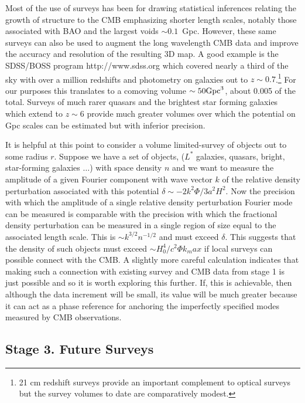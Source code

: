 \documentclass[psfig,11pt]{article}
\begin{document}
Most of the use of surveys has been for drawing statistical inferences relating the growth of structure to the CMB emphasizing shorter length scales, notably those associated with BAO and the largest voids $\sim0.1$~Gpc. However, these same surveys can also be used to augment the long wavelength CMB data and improve the accuracy and resolution of the resulting 3D map. A good example is the SDSS/BOSS program http://www.sdss.org which covered nearly a third of the sky with over a million redshifts and photometry on galaxies out to $z\sim0.7$.\footnote{21 cm redshift surveys provide an important complement to optical surveys but the survey volumes to date are comparatively modest.} For our purposes this translates to a comoving volume $\sim50{\rm Gpc}^3$, about 0.005 of the total. Surveys of much rarer quasars and the brightest star forming galaxies which extend to  $z\sim6$ provide much greater volumes over which the potential on Gpc scales can be estimated but with inferior precision.

It is helpful at this point to consider a volume limited-survey of objects out to some radius $r$. Suppose we have a set of objects, ($L^\ast$ galaxies, quasars, bright, star-forming galaxies $\dots$) with space density $n$ and we want to measure the amplitude of a given Fourier component with wave vector $k$ of the relative density perturbation associated with this potential $\delta\sim-2k^2\Phi/3a^2H^2$. Now the precision with which the amplitude of a single relative density perturbation Fourier mode can be measured is comparable with the precision with which the fractional density perturbation can be measured in a single region of size equal to the associated length scale. This is $\sim k^{3/2}n^{-1/2}$ and must exceed $\delta$. This suggests that the density of such objects must exceed $\sim H_0^4/c^2\Phi k_max$ if local surveys can possible connect with the CMB. A slightly more careful calculation indicates that making such a connection with existing survey and CMB data from stage 1 is just possible and so it is worth exploring this further. If, this is achievable, then although the data increment will be small, its value will be much greater because it can act as a phase reference for anchoring the imperfectly specified modes measured by CMB observations.


\subsection{Stage 3. Future Surveys}
\end{document}
